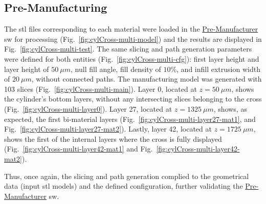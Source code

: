 \subsection{Pre-Manufacturing}%
\label{sec:pre-manufacturing-multiLaser}
The \gls{stl} files corresponding to each material were loaded in the
\underline{Pre-Manufacturer} \gls{sw} for processing
(Fig.~\ref{fig:cylCross-multi-model}) and the results are displayed in Fig.~\ref{fig:cylCross-multi-test}. The same slicing and path generation
parameters were defined for both entities (Fig.~\ref{fig:cylCross-multi-cfg}):
first layer height and layer height of $50~\mu m$, null fill angle, fill density
of $10\%$, and infill extrusion width of $20~\mu m$, without connected
paths.
%
The manufacturing model was generated with 103 slices
(Fig.~\ref{fig:cylCross-multi-main}). Layer $0$, located at $z = 50~\mu m$, shows the
cylinder's bottom layers, without any intersecting slices belonging to the cross
(Fig.~\ref{fig:cylCross-multi-layer0}).
Layer 27, located at
$z = 1325~\mu m$, shows, as expected, the first bi-material layers (Fig.~\ref{fig:cylCross-multi-layer27-mat1}, and
Fig.~\ref{fig:cylCross-multi-layer27-mat2}).
Lastly, layer 42, located at $z = 1725~\mu m$, shows the first of the internal
layers where the cross is fully displayed
(Fig.~\ref{fig:cylCross-multi-layer42-mat1} and Fig.~\ref{fig:cylCross-multi-layer42-mat2}).

Thus, once again, the slicing and path generation complied to the geometrical data (input
\gls{stl} models) and the defined configuration, further validating the \underline{Pre-Manufacturer} \gls{sw}.

